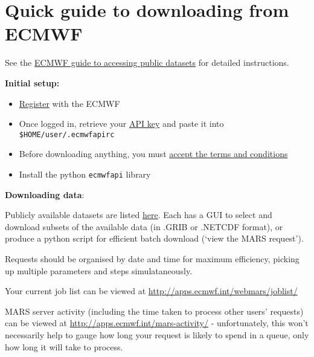 \documentclass[10pt,fleqn]{article}
\begin{document}
\section{Quick guide to downloading from ECMWF}

See the \href{https://software.ecmwf.int/wiki/display/WEBAPI/Access+ECMWF+Public+Datasets}{ECMWF guide to accessing public datasets} for detailed  instructions.

\textbf{Initial setup:}

\begin{itemize}

\item \href{https://apps.ecmwf.int/registration/}{Register} with the ECMWF

\item Once logged in, retrieve your \href{https://api.ecmwf.int/v1/key/}{API key} and paste it into \texttt{\$HOME/user/.ecmwfapirc}

\item Before downloading anything, you must \href{http://apps.ecmwf.int/datasets/data/interim-full-daily/licence/}{accept the terms and conditions}
\item Install the python \texttt{ecmwfapi} library \\[5pt]
\end{itemize}

\vspace{10pt}
\textbf{Downloading data}:

Publicly available datasets are listed \href{http://apps.ecmwf.int/datasets/}{here}. Each has a GUI to select and download subsets of the available data (in .GRIB or .NETCDF format), or produce a python script for efficient batch download (`view the MARS request').

Requests should be organised by date and time for maximum efficiency, picking up multiple parameters and steps simulataneously.
 
Your current job list can be viewed at \url{http://apps.ecmwf.int/webmars/joblist/}

MARS server activity (including the time taken to process other users' requests) can be viewed at \url{http://apps.ecmwf.int/mars-activity/} - unfortunately, this won't necessarily help to gauge how long your request is likely to spend in a queue, only how long it will take to process.\\[10pt]
\end{document}
